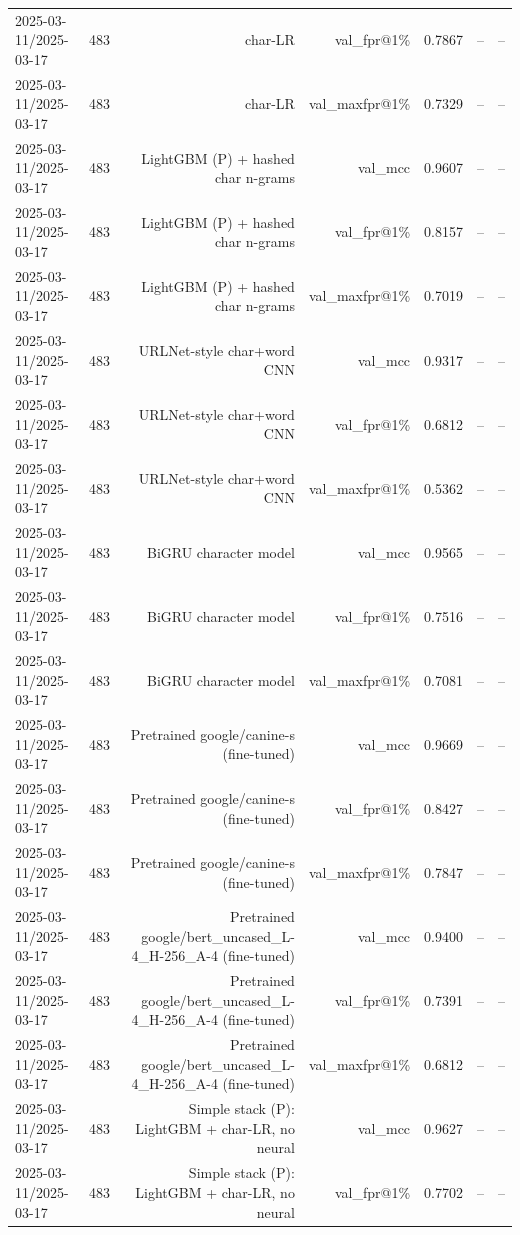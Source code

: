 \begin{table}[t]
\begin{tabular}{llrrrrr}
2025-03-11/2025-03-17 & 483 & char-LR & val\_fpr@1\% & 0.7867 & -- & -- \\
2025-03-11/2025-03-17 & 483 & char-LR & val\_maxfpr@1\% & 0.7329 & -- & -- \\
2025-03-11/2025-03-17 & 483 & LightGBM (P) + hashed char n-grams & val\_mcc & 0.9607 & -- & -- \\
2025-03-11/2025-03-17 & 483 & LightGBM (P) + hashed char n-grams & val\_fpr@1\% & 0.8157 & -- & -- \\
2025-03-11/2025-03-17 & 483 & LightGBM (P) + hashed char n-grams & val\_maxfpr@1\% & 0.7019 & -- & -- \\
2025-03-11/2025-03-17 & 483 & URLNet-style char+word CNN & val\_mcc & 0.9317 & -- & -- \\
2025-03-11/2025-03-17 & 483 & URLNet-style char+word CNN & val\_fpr@1\% & 0.6812 & -- & -- \\
2025-03-11/2025-03-17 & 483 & URLNet-style char+word CNN & val\_maxfpr@1\% & 0.5362 & -- & -- \\
2025-03-11/2025-03-17 & 483 & BiGRU character model & val\_mcc & 0.9565 & -- & -- \\
2025-03-11/2025-03-17 & 483 & BiGRU character model & val\_fpr@1\% & 0.7516 & -- & -- \\
2025-03-11/2025-03-17 & 483 & BiGRU character model & val\_maxfpr@1\% & 0.7081 & -- & -- \\
2025-03-11/2025-03-17 & 483 & Pretrained google/canine-s (fine-tuned) & val\_mcc & 0.9669 & -- & -- \\
2025-03-11/2025-03-17 & 483 & Pretrained google/canine-s (fine-tuned) & val\_fpr@1\% & 0.8427 & -- & -- \\
2025-03-11/2025-03-17 & 483 & Pretrained google/canine-s (fine-tuned) & val\_maxfpr@1\% & 0.7847 & -- & -- \\
2025-03-11/2025-03-17 & 483 & Pretrained google/bert\_uncased\_L-4\_H-256\_A-4 (fine-tuned) & val\_mcc & 0.9400 & -- & -- \\
2025-03-11/2025-03-17 & 483 & Pretrained google/bert\_uncased\_L-4\_H-256\_A-4 (fine-tuned) & val\_fpr@1\% & 0.7391 & -- & -- \\
2025-03-11/2025-03-17 & 483 & Pretrained google/bert\_uncased\_L-4\_H-256\_A-4 (fine-tuned) & val\_maxfpr@1\% & 0.6812 & -- & -- \\
2025-03-11/2025-03-17 & 483 & Simple stack (P): LightGBM + char-LR, no neural & val\_mcc & 0.9627 & -- & -- \\
2025-03-11/2025-03-17 & 483 & Simple stack (P): LightGBM + char-LR, no neural & val\_fpr@1\% & 0.7702 & -- & -- \\

\end{tabular}
\end{table}

